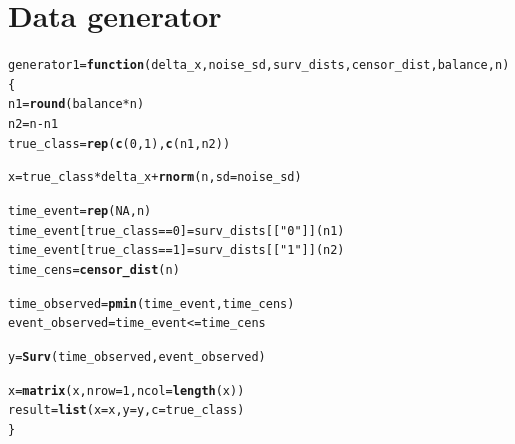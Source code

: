 \documentclass{article}\usepackage[]{graphicx}\usepackage[]{color}
\makeatletter
\newcommand{\hlnum}[1]{\textcolor[rgb]{0.686,0.059,0.569}{#1}}%
\newcommand{\hlstr}[1]{\textcolor[rgb]{0.192,0.494,0.8}{#1}}%
\newcommand{\hlopt}[1]{\textcolor[rgb]{0,0,0}{#1}}%
\newcommand{\hlstd}[1]{\textcolor[rgb]{0.345,0.345,0.345}{#1}}%
\newcommand{\hlkwa}[1]{\textcolor[rgb]{0.161,0.373,0.58}{\textbf{#1}}}%
\newcommand{\hlkwb}[1]{\textcolor[rgb]{0.69,0.353,0.396}{#1}}%
\newcommand{\hlkwc}[1]{\textcolor[rgb]{0.333,0.667,0.333}{#1}}%
\newcommand{\hlkwd}[1]{\textcolor[rgb]{0.737,0.353,0.396}{\textbf{#1}}}%
\newenvironment{kframe}{%
 \def\at@end@of@kframe{}%
 \ifinner\ifhmode%
  \def\at@end@of@kframe{\end{minipage}}%
  \begin{minipage}{\columnwidth}%
 \fi\fi%
 \def\FrameCommand##1{\hskip\@totalleftmargin \hskip-\fboxsep
 \colorbox{shadecolor}{##1}\hskip-\fboxsep
     \hskip-\linewidth \hskip-\@totalleftmargin \hskip\columnwidth}%
 \MakeFramed {\advance\hsize-\width
   \@totalleftmargin\z@ \linewidth\hsize
   \@setminipage}}%
 {\par\unskip\endMakeFramed%
 \at@end@of@kframe}
\newenvironment{knitrout}{}{} %
\makeatother
\begin{document}
\section{Data generator}
\begin{knitrout}
\color{fgcolor}\begin{kframe}
\begin{alltt}
\hlstd{generator1} \hlkwb{=} \hlkwa{function}\hlstd{(}\hlkwc{delta_x}\hlstd{,} \hlkwc{noise_sd}\hlstd{,} \hlkwc{surv_dists}\hlstd{,} \hlkwc{censor_dist}\hlstd{,} \hlkwc{balance}\hlstd{,} \hlkwc{n}\hlstd{)}
\hlstd{\{}
        \hlstd{n1} \hlkwb{=} \hlkwd{round}\hlstd{(balance} \hlopt{*} \hlstd{n)}
        \hlstd{n2} \hlkwb{=} \hlstd{n} \hlopt{-} \hlstd{n1}
        \hlstd{true_class} \hlkwb{=} \hlkwd{rep}\hlstd{(}\hlkwd{c}\hlstd{(}\hlnum{0}\hlstd{,} \hlnum{1}\hlstd{),} \hlkwd{c}\hlstd{(n1, n2))}

        \hlstd{x} \hlkwb{=} \hlstd{true_class}\hlopt{*}\hlstd{delta_x} \hlopt{+} \hlkwd{rnorm}\hlstd{(n,} \hlkwc{sd} \hlstd{= noise_sd)}

        \hlstd{time_event} \hlkwb{=} \hlkwd{rep}\hlstd{(}\hlnum{NA}\hlstd{, n)}
        \hlstd{time_event[true_class} \hlopt{==} \hlnum{0}\hlstd{]} \hlkwb{=} \hlstd{surv_dists[[}\hlstr{"0"}\hlstd{]](n1)}
        \hlstd{time_event[true_class} \hlopt{==} \hlnum{1}\hlstd{]} \hlkwb{=} \hlstd{surv_dists[[}\hlstr{"1"}\hlstd{]](n2)}
        \hlstd{time_cens} \hlkwb{=} \hlkwd{censor_dist}\hlstd{(n)}

        \hlstd{time_observed} \hlkwb{=} \hlkwd{pmin}\hlstd{(time_event, time_cens)}
        \hlstd{event_observed} \hlkwb{=} \hlstd{time_event} \hlopt{<=} \hlstd{time_cens}

        \hlstd{y} \hlkwb{=} \hlkwd{Surv}\hlstd{(time_observed, event_observed)}

        \hlstd{x} \hlkwb{=} \hlkwd{matrix}\hlstd{(x,} \hlkwc{nrow} \hlstd{=} \hlnum{1}\hlstd{,} \hlkwc{ncol} \hlstd{=} \hlkwd{length}\hlstd{(x))}
        \hlstd{result} \hlkwb{=} \hlkwd{list}\hlstd{(}\hlkwc{x} \hlstd{= x,} \hlkwc{y} \hlstd{= y,} \hlkwc{c} \hlstd{= true_class)}
\hlstd{\}}
\end{alltt}
\end{kframe}
\end{knitrout}
\end{document}
